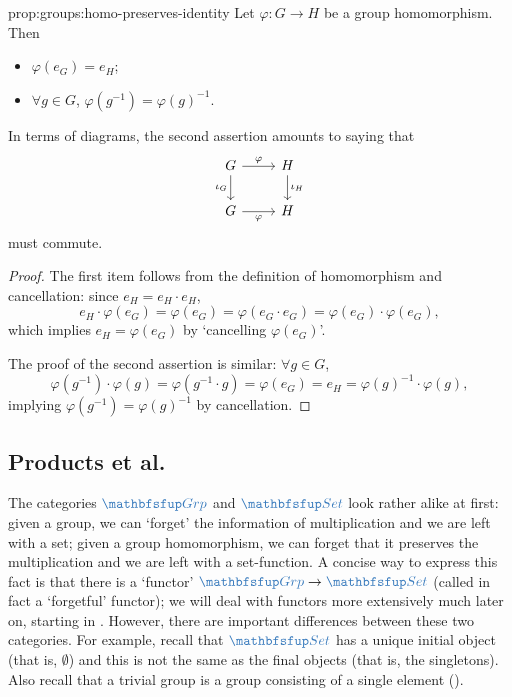 \begin{prop}{}{prop:groups:homo-preserves-identity}
  Let $\varphi : G \to H$ be a group homomorphism. Then
  \begin{itemize}
  \item $\varphi(e_G) = e_H$;
  \item $\forall g \in G$, $\varphi(g^{-1}) = \varphi(g)^{-1}$.
  \end{itemize}
  In terms of diagrams, the second assertion amounts to saying that
  \[
    \begin{tikzcd}
      G \arrow[r, "\varphi"] \arrow[d, "\iota_G"'] & H \arrow[d, "\iota_H"] \\
      G \arrow[r, "\varphi"'] & H
    \end{tikzcd}
  \]
  must commute.
\end{prop}
\begin{proof}
  The first item follows from the definition of homomorphism and
  cancellation: since $e_H = e_H \cdot e_H$,
  \[
    e_H \cdot \varphi(e_G) = \varphi(e_G) = \varphi(e_G \cdot e_G) =
    \varphi(e_G) \cdot \varphi(e_G),
  \]
  which implies $e_H = \varphi(e_G)$ by `cancelling $\varphi(e_G)$'.

  The proof of the second assertion is similar: $\forall g \in G$,
  \[
    \varphi(g^{-1}) \cdot \varphi(g) = \varphi(g^{-1} \cdot g) =
    \varphi(e_G) = e_H = \varphi(g)^{-1} \cdot \varphi(g),
  \]
  implying $\varphi(g^{-1}) = \varphi(g)^{-1}$ by cancellation.
\end{proof}

\subsection{Products et al.}
\label{subsec:groups:products-et-al}
The categories $\categ{Grp}$ and $\categ{Set}$ look rather alike at
first: given a group, we can `forget' the information of
multiplication and we are left with a set; given a group homomorphism,
we can forget that it preserves the multiplication and we are left
with a set-function. A concise way to express this fact is that there
is a `functor' $\categ{Grp} \to \categ{Set}$ (called in fact a
`forgetful' functor); we will deal with functors more extensively much
later on, starting in .  However, there are
important differences between these two categories. For example,
recall that $\categ{Set}$ has a unique initial object (that is,
$\emptyset$) and this is not the same as the final objects (that is,
the singletons). Also recall that a trivial group is a group
consisting of a single element ().

